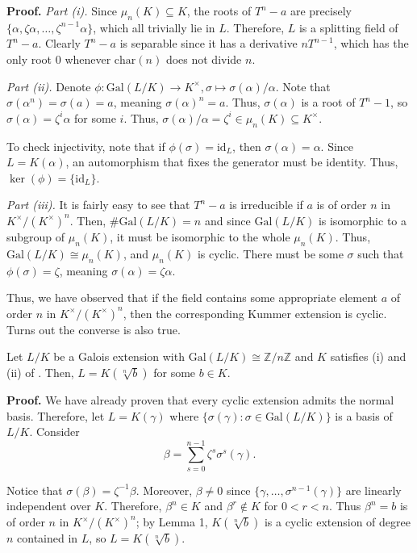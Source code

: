 \documentclass{template}
\begin{document}
\textbf{Proof.} \textit{Part (i).} Since $\mu_n(K) \subseteq K$, the roots of
$T^n-a$ are precisely $\{\alpha,\zeta\alpha,\dots,\zeta^{n-1}\alpha\}$, which 
all trivially lie in $L$. Therefore, $L$ is a splitting field of $T^n-a$. 
Clearly $T^n-a$ is separable since it has a derivative $nT^{n-1}$, which 
has the only root $0$ whenever $\text{char}(n)$ does not divide $n$.

\textit{Part (ii).} Denote $\phi: \text{Gal}(L/K) \to K^{\times}, \sigma \mapsto
\sigma(\alpha)/\alpha$. Note that $\sigma(\alpha^n) = \sigma(a) = a$, meaning
$\sigma(\alpha)^n = a$. Thus, $\sigma(\alpha)$ is a root of $T^n-1$, so
$\sigma(\alpha) = \zeta^i\alpha$ for some $i$. Thus, $\sigma(\alpha)/\alpha =
\zeta^i \in \mu_n(K) \subseteq K^{\times}$.

To check injectivity, note that if $\phi(\sigma)=\text{id}_L$, then
$\sigma(\alpha)=\alpha$. Since $L=K(\alpha)$, an automorphism that fixes the
generator must be identity. Thus, $\ker(\phi)=\{\text{id}_L\}$.

\textit{Part (iii).} It is fairly easy to see that $T^n-a$ is irreducible if $a$
is of order $n$ in $K^{\times}/(K^{\times})^n$. Then, $\#\text{Gal}(L/K)=n$ and
since $\text{Gal}(L/K)$ is isomorphic to a subgroup of $\mu_n(K)$, it must be
isomorphic to the whole $\mu_n(K)$. Thus, $\text{Gal}(L/K) \cong \mu_n(K)$, and
$\mu_n(K)$ is cyclic. There must be some $\sigma$ such that
$\phi(\sigma)=\zeta$, meaning $\sigma(\alpha)=\zeta\alpha$.

Thus, we have observed that if the field contains some appropriate element $a$
of order $n$ in $K^{\times}/(K^{\times})^n$, then the corresponding 
Kummer extension is cyclic. Turns out the converse is also true.

\begin{lemma}\label{lemma:cyclic-extension}
    Let $L/K$ be a Galois extension with $\text{Gal}(L/K) \cong
    \mathbb{Z}/n\mathbb{Z}$ and $K$ satisfies (i) and (ii) of
    . Then, $L=K(\sqrt[n]{b})$ for some $b \in K$.
\end{lemma}

\textbf{Proof.} We have already proven that every cyclic extension admits the
normal basis. Therefore, let $L=K(\gamma)$ where $\{\sigma(\gamma): \sigma \in
\text{Gal}(L/K)\}$ is a basis of $L/K$. Consider
\begin{equation*}
    \beta = \sum_{s=0}^{n-1}\zeta^s\sigma^s(\gamma).
\end{equation*}

Notice that $\sigma(\beta) = \zeta^{-1}\beta$. Moreover, $\beta \neq 0$ since
$\{\gamma,\dots,\sigma^{n-1}(\gamma)\}$ are linearly independent over $K$. Therefore,
$\beta^n \in K$ and $\beta^r \not\in K$ for $0<r<n$. Thus $\beta^n=b$ is of
order $n$ in $K^{\times}/(K^{\times})^n$; by Lemma 1, $K(\sqrt[n]{b})$ is a
cyclic extension of degree $n$ contained in $L$, so $L=K(\sqrt[n]{b})$.
\end{document}
